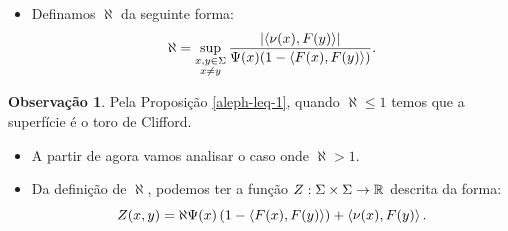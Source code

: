 \documentclass[12pt,a4paper]{beamer}
\theoremstyle{definition}
\newtheorem{observacao}{Observação}
\begin{document}
\begin{frame}
	
	\begin{itemize}
		\item Definamos $\aleph$ da seguinte forma:
		\begin{equation*}
		\aleph = \sup_{\substack{x,y \in \Sigma \\ x \neq y}} \frac{\left| \left\langle \nu(x),F(y) \right\rangle \right|}{\Psi(x) (1-\left\langle F(x),F(y) \right\rangle)}.
		\end{equation*}
	\end{itemize}
	
	\pause
	
	\begin{observacao}
		Pela Proposição \ref{aleph-leq-1}, quando $\aleph \leq 1$ temos que a superfície é o toro de Clifford. 
	\end{observacao}

	\pause

	\begin{itemize}
		\item A partir de agora vamos analisar o caso onde $\aleph > 1$.
		
		\pause
		
		\item 	Da definição de $\aleph$, podemos ter a função $Z: \Sigma \times \Sigma \rightarrow \mathbb R$ descrita da forma:
		\begin{equation*}
		Z(x,y) = \aleph \Psi(x) \left(1 - \left\langle F(x),F(y) \right\rangle \right) + \left\langle \nu(x),F(y) \right\rangle.
		\end{equation*}
		
		
	\end{itemize}

\end{frame}
	
\end{document}
